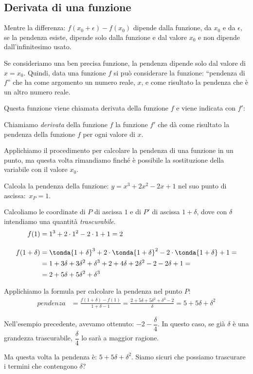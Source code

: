 \subsection{Derivata di una funzione}
\label{subsec:differenziazione_derivatafunzione}

Mentre la differenza: \(f(x_0 + \epsilon) - f(x_0)\) dipende dalla 
funzione, da \(x_0\) e da \(\epsilon\),
se la pendenza esiste, dipende solo dalla funzione e dal valore \(x_0\) 
e non dipende dall'infinitesimo usato.

Se consideriamo una ben precisa funzione, la pendenza dipende solo dal 
valore di \(x = x_0\).
Quindi, data una funzione \(f\) si può considerare la funzione: 
``pendenza di \(f\)'' che ha come argomento un numero reale, \(x\), 
e come risultato la pendenza che è un altro numero reale.

Questa funzione viene chiamata derivata della funzione \(f\) 
e viene indicata con \(f'\):

\begin{definizione}
Chiamiamo \emph{derivata} della funzione \(f\) la funzione \(f'\) che
dà come risultato la pendenza della funzione \(f\) per ogni valore 
di \(x\).
\end{definizione}

Applichiamo il procedimento per calcolare la pendenza di una funzione 
in un punto, ma questa volta rimandiamo finché è possibile la sostituzione 
della variabile con il valore \(x_0\).

\begin{esempio}

Calcola la pendenza della funzione: 
\(y=x^3 +2x^2 -2x +1\) \quad
nel suo punto di ascissa:~\(x_P = 1\).

Calcoliamo le coordinate di \(P\) di ascissa \(1\) e 
di \(P'\) di ascissa \(1+\delta\), dove con \(\delta\) intendiamo una 
quantità \emph{trascurabile}.
\begin{align*}
f(1) &= 1^3 + 2 \cdot 1^2 - 2 \cdot 1 + 1 = 2\\[1em]
f(1 + \delta) &= 
\tonda{1+\delta}^3 +2 \cdot \tonda{1+\delta}^2 -2 \cdot \tonda{1+\delta} +1 =\\
&= 1+3\delta+3\delta^2+\delta^3+2+4\delta+2\delta^2-2-2\delta+1=\\
&=2+5\delta+5\delta^2+\delta^3
\end{align*}

Applichiamo la formula per calcolare la pendenza nel punto \(P\):
\begin{align*}
pendenza&=\frac{f(1+\delta) - f(1)}{1 + \delta -1}=
          \frac{2+5\delta+5\delta^2+\delta^3-2}{\delta}=
        5+5\delta+\delta^2
\end{align*}

Nell'esempio precedente, avevamo ottenuto: \(-2 -\dfrac{\delta}{4}\). 
In questo caso, se già \(\delta\) è una grandezza trascurabile, 
\(\dfrac{\delta}{4}\) lo sarà a maggior ragione.

Ma questa volta la pendenza è: \(5+5\delta+\delta^2\). 
Siamo sicuri che possiamo trascurare i termini che contengono \(\delta\)?
\end{esempio}



